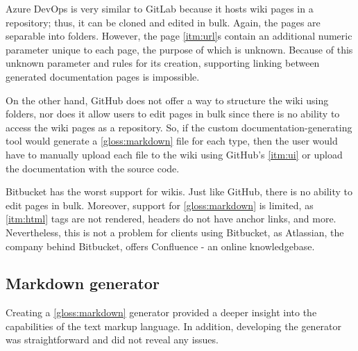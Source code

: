 Azure DevOps is very similar to GitLab because it hosts wiki pages in a repository; thus, it can be cloned and edited in bulk. Again, the pages are separable into folders. However, the page \ref{itm:url}s contain an additional numeric parameter unique to each page, the purpose of which is unknown. Because of this unknown parameter and rules for its creation, supporting linking between generated documentation pages is impossible.

On the other hand, GitHub does not offer a way to structure the wiki using folders, nor does it allow users to edit pages in bulk since there is no ability to access the wiki pages as a repository. So, if the custom documentation-generating tool would generate a \ref{gloss:markdown} file for each type, then the user would have to manually upload each file to the wiki using GitHub's \ref{itm:ui} or upload the documentation with the source code.

Bitbucket has the worst support for wikis.
Just like GitHub, there is no ability to edit pages in bulk.
Moreover, support for \ref{gloss:markdown} is limited, as \ref{itm:html} tags are not rendered, headers do not have anchor links, and more.
Nevertheless, this is not a problem for clients using Bitbucket, as Atlassian, the company behind Bitbucket, offers Confluence - an online knowledgebase.

\subsection{Markdown generator}

Creating a \ref{gloss:markdown} generator provided a deeper insight into the capabilities of the text markup language. In addition, developing the generator was straightforward and did not reveal any issues.
